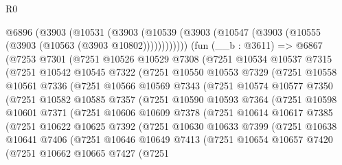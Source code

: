 \begin{lexlean}{R0}
\begin{coremodule}
    @6896
      (@3903
        (@10531
          (@3903 (@10539 (@3903 (@10547 (@3903 (@10555 (@3903 (@10563 (@3903 @10802))))))))))))
    (fun (__b : @3611) =>
    @6867
      (@7253
        @7301
        (@7251
          @10526
          @10529
          @7308
          (@7251
            @10534
            @10537
            @7315
            (@7251
              @10542
              @10545
              @7322
              (@7251
                @10550
                @10553
                @7329
                (@7251
                  @10558
                  @10561
                  @7336
                  (@7251
                    @10566
                    @10569
                    @7343
                    (@7251
                      @10574
                      @10577
                      @7350
                      (@7251
                        @10582
                        @10585
                        @7357
                        (@7251
                          @10590
                          @10593
                          @7364
                          (@7251
                            @10598
                            @10601
                            @7371
                            (@7251
                              @10606
                              @10609
                              @7378
                              (@7251
                                @10614
                                @10617
                                @7385
                                (@7251
                                  @10622
                                  @10625
                                  @7392
                                  (@7251
                                    @10630
                                    @10633
                                    @7399
                                    (@7251
                                      @10638
                                      @10641
                                      @7406
                                      (@7251
                                        @10646
                                        @10649
                                        @7413
                                        (@7251
                                          @10654
                                          @10657
                                          @7420
                                          (@7251
                                            @10662
                                            @10665
                                            @7427
                                            (@7251

\end{coremodule}
\end{lexlean}

